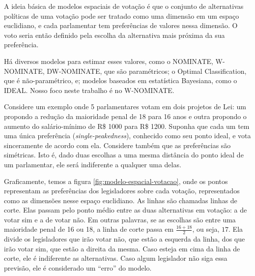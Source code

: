 A ideia básica de modelos espaciais de votação é que o conjunto de alternativas
políticas de uma votação pode ser tratado como uma dimensão em um espaço
euclidiano, e cada parlamentar tem preferências de valores nessa dimensão. O
voto seria então definido pela escolha da alternativa mais próxima da sua
preferência.

Há diversos modelos para estimar esses valores, como o NOMINATE, W-NOMINATE,
DW-NOMINATE, que são paramétricos; o Optimal Classification, que é
não-paramétrico, e; modelos baseados em estatística Bayesiana, como o IDEAL.
Nosso foco neste trabalho é no W-NOMINATE.
\cite{Poole2000,Poole2005,Poole2014,Jackman2000,Clinton2004}

Considere um exemplo onde 5 parlamentares votam em
dois projetos de Lei: um propondo a redução da maioridade penal de
18 para 16 anos e outra
propondo o aumento do salário-mínimo de R\$ 1000 para
R\$ 1200. Suponha que cada um tem uma única preferência
(\emph{single-peakedness}), conhecido como seu ponto ideal, e vota sinceramente
de acordo com ela. Considere também que as preferências são simétricas. Isto é,
dado duas escolhas a uma mesma distância do ponto ideal de um parlamentar, ele
será indiferente a qualquer uma delas.

Graficamente, temos a figura \ref{fig:modelo-espacial-votacao}, onde os pontos
representam as preferências dos legisladores sobre cada votação, representados
como as dimensões nesse espaço euclidiano. As linhas são chamadas linhas de
corte. Elas passam pelo ponto médio entre as duas alternativas em votação: a de
votar sim e a de votar não. Em outras palavras, se as escolhas são entre uma
maioridade penal de 16 ou
18, a linha de corte passa em $\frac{16 + 18}{2}$,
ou seja, $17$. Ela divide os legisladores que irão votar não, que estão a
esquerda da linha, dos que irão votar sim, que estão a direita da mesma. Caso
esteja em cima da linha de corte, ele é indiferente as alternativas. Caso algum
legislador não siga essa previsão, ele é considerado um ``erro'' do modelo.

\begin{knitrout}
\color{fgcolor}\begin{kframe}
\begin{alltt}
 \hlstd{(}    \hlopt{+}
  \hlstd{(}\hlstd{(} \hlopt{$} \hlopt{+}
  \hlstd{(}\hlstd{(} \hlopt{$} \hlopt{+}
  \hlstd{(} \hlstd{=} \hlstd{)} \hlopt{+}
  \hlstd{()} \hlopt{+}
  \hlstd{(} \hlstd{=} \hlstd{,}  \hlstd{=} \hlstd{)}
\end{alltt}


{\ttfamily\noindent\bfseries{}}\end{kframe}
\end{knitrout}

